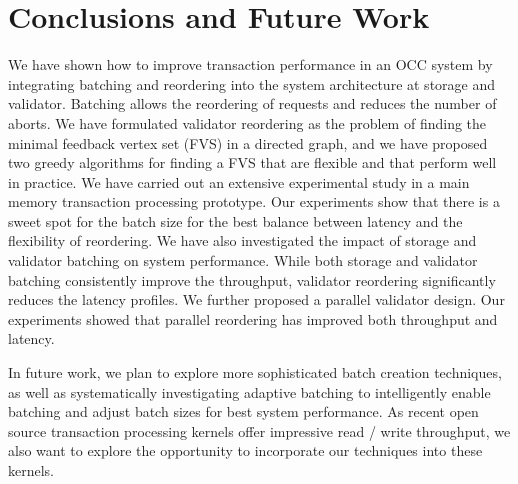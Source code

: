 \section{Conclusions and Future Work}\label{sec:conclusion}
We have shown how to improve transaction performance in an OCC system by integrating batching and reordering into the system architecture at storage and validator. Batching allows the reordering of requests and reduces the number of aborts. We have formulated validator reordering as the problem of finding the minimal feedback vertex set (FVS) in a directed graph, and we have proposed two greedy algorithms for finding a FVS that are flexible and that perform well in practice. We have carried out an extensive experimental study in a main memory transaction processing prototype. Our experiments show that there is a sweet spot for the batch size for the best balance between latency and the flexibility of reordering. We have also investigated the impact of storage and validator batching on system performance. While both storage and validator batching consistently improve the throughput, validator reordering significantly reduces the latency profiles. We further proposed a parallel validator design. Our experiments showed that parallel reordering has improved both throughput and latency.

In future work, we plan to explore more sophisticated batch creation techniques, as well as systematically investigating adaptive batching to intelligently enable batching and adjust batch sizes for best system performance. As recent open source transaction processing kernels offer impressive
read / write throughput, we also want to explore
the opportunity to incorporate our techniques into these kernels.
